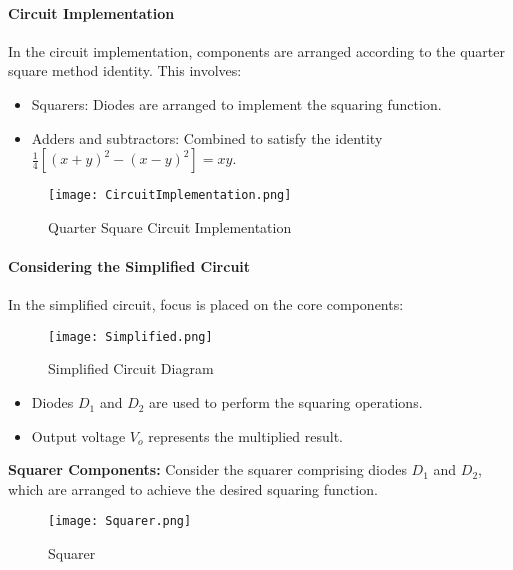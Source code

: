 \documentclass[a4paper,9pt,twoside,openany,twocolumn]{memoir}
\begin{document}
\paragraph{Circuit Implementation}
In the circuit implementation, components are arranged according to the quarter square method identity. This involves:
\begin{itemize}
    \item Squarers: Diodes are arranged to implement the squaring function.
    \item Adders and subtractors: Combined to satisfy the identity \(\frac{1}{4} \left[(x + y)^2 - (x - y)^2\right] = xy\).
\end{itemize}

\begin{figure}[h]
    \centering
    \texttt{[image: CircuitImplementation.png]} %
    \caption{Quarter Square Circuit Implementation}
    \label{fig:quarter_square_circuit}
\end{figure}


\paragraph{Considering the Simplified Circuit}
In the simplified circuit, focus is placed on the core components: 

\begin{figure}[h]
    \centering
    \texttt{[image: Simplified.png]} %
    \caption{Simplified Circuit Diagram}
    \label{fig:simplified_circuit}
\end{figure}

\begin{itemize}
    \item Diodes \( D_1 \) and \( D_2 \) are used to perform the squaring operations.
    \item Output voltage \( V_o \) represents the multiplied result.
\end{itemize}





\textbf{Squarer Components:} Consider the squarer comprising diodes \( D_1 \) and \( D_2 \), which are arranged to achieve the desired squaring function.

\begin{figure}[h]
    \centering
    \texttt{[image: Squarer.png]} %
    \caption{Squarer}
    \label{fig:squarer}
\end{figure}
\end{document}
